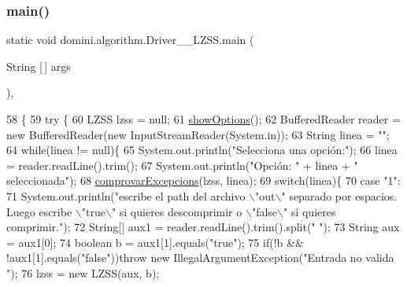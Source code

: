 \subsubsection{\texorpdfstring{main()}{main()}}
{\footnotesize\ttfamily static void domini.\+algorithm.\+Driver\+\_\+\+\_\+\+L\+Z\+S\+S.\+main (\begin{DoxyParamCaption}\item[{String \mbox{[}$\,$\mbox{]}}]{args }\end{DoxyParamCaption})\hspace{0.3cm}{\ttfamily [inline]}, {\ttfamily [static]}}


\begin{DoxyCode}
58                                            \{
59     \textcolor{keywordflow}{try} \{
60         LZSS lzss = null;
61         \hyperlink{classdomini_1_1algorithm_1_1Driver____LZSS_a4362a21690fbdb3ef42dd6f8ca0f0da6}{showOptions}();
62         BufferedReader reader = \textcolor{keyword}{new} BufferedReader(\textcolor{keyword}{new} InputStreamReader(System.in));
63         String linea = \textcolor{stringliteral}{""};
64         \textcolor{keywordflow}{while}(linea != null)\{
65             System.out.println(\textcolor{stringliteral}{"Selecciona una opción:"});
66             linea = reader.readLine().trim();
67             System.out.println(\textcolor{stringliteral}{"Opción: "} + linea + \textcolor{stringliteral}{" seleccionada"});
68             \hyperlink{classdomini_1_1algorithm_1_1Driver____LZSS_a3b1983c6a71cd4d510e8434cd2e7f8f2}{comprovarExcepcions}(lzss, linea);
69             \textcolor{keywordflow}{switch}(linea)\{
70                 \textcolor{keywordflow}{case} \textcolor{stringliteral}{"1"}:
71                     System.out.println(\textcolor{stringliteral}{"escribe el path del archivo \(\backslash\)"out\(\backslash\)" separado por espacios. Luego
       escribe \(\backslash\)"true\(\backslash\)" si quieres descomprimir o \(\backslash\)"false\(\backslash\)" si quieres comprimir."});
72                     String[] aux1 = reader.readLine().trim().split(\textcolor{stringliteral}{" "});
73                     String aux = aux1[0];
74                     \textcolor{keywordtype}{boolean} b = aux1[1].equals(\textcolor{stringliteral}{"true"});
75                     \textcolor{keywordflow}{if}(!b && !aux1[1].equals(\textcolor{stringliteral}{"false"}))\textcolor{keywordflow}{throw} \textcolor{keyword}{new} IllegalArgumentException(\textcolor{stringliteral}{"Entrada no valida
      "});
76                     lzss = \textcolor{keyword}{new} LZSS(aux, b);

\end{DoxyCode}
